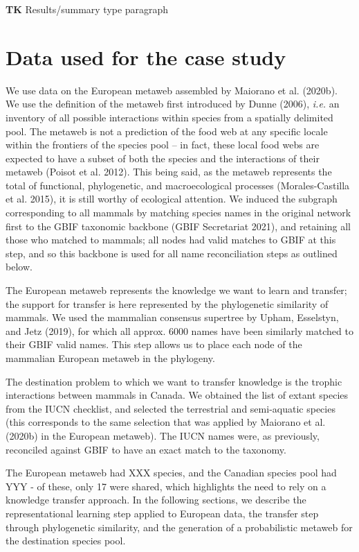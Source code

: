 \documentclass[10pt,oneside]{article}
\begin{document}
\textbf{TK} Results/summary type paragraph

\hypertarget{data-used-for-the-case-study}{%
\section{Data used for the case
study}\label{data-used-for-the-case-study}}

We use data on the European metaweb assembled by Maiorano et al.
(2020b). We use the definition of the metaweb first introduced by Dunne
(2006), \emph{i.e.} an inventory of all possible interactions within
species from a spatially delimited pool. The metaweb is not a prediction
of the food web at any specific locale within the frontiers of the
species pool -- in fact, these local food webs are expected to have a
subset of both the species and the interactions of their metaweb (Poisot
et al. 2012). This being said, as the metaweb represents the total of
functional, phylogenetic, and macroecological processes
(Morales-Castilla et al. 2015), it is still worthy of ecological
attention. We induced the subgraph corresponding to all mammals by
matching species names in the original network first to the GBIF
taxonomic backbone (GBIF Secretariat 2021), and retaining all those who
matched to mammals; all nodes had valid matches to GBIF at this step,
and so this backbone is used for all name reconciliation steps as
outlined below.

The European metaweb represents the knowledge we want to learn and
transfer; the support for transfer is here represented by the
phylogenetic similarity of mammals. We used the mammalian consensus
supertree by Upham, Esselstyn, and Jetz (2019), for which all approx.
6000 names have been similarly matched to their GBIF valid names. This
step allows us to place each node of the mammalian European metaweb in
the phylogeny.

The destination problem to which we want to transfer knowledge is the
trophic interactions between mammals in Canada. We obtained the list of
extant species from the IUCN checklist, and selected the terrestrial and
semi-aquatic species (this corresponds to the same selection that was
applied by Maiorano et al. (2020b) in the European metaweb). The IUCN
names were, as previously, reconciled against GBIF to have an exact
match to the taxonomy.

The European metaweb had XXX species, and the Canadian species pool had
YYY - of these, only 17 were shared, which highlights the need to rely
on a knowledge transfer approach. In the following sections, we describe
the representational learning step applied to European data, the
transfer step through phylogenetic similarity, and the generation of a
probabilistic metaweb for the destination species pool.
\end{document}
